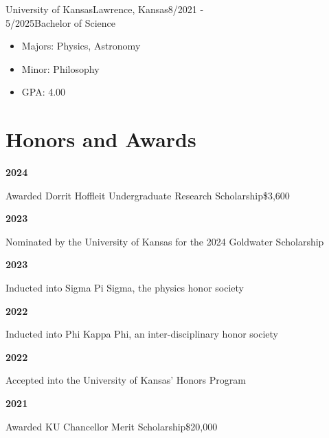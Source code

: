 \documentclass[12pt]{article}
\begin{document}
\begin{education}{University of Kansas}{Lawrence, Kansas}{8/2021 -\\ 5/2025}{Bachelor of Science}
  \begin{itemize}
    \item Majors: Physics, Astronomy
    \item Minor: Philosophy
    \item GPA: 4.00
  \end{itemize}
\end{education}



\section*{Honors and Awards}\vspace{-1ex}

\newcommand{\award}[3]{
  \begin{minipage}[t]{0.75in}
    \textbf{#1}
  \end{minipage}
  \begin{minipage}[t]{\dimexpr\textwidth-0.75in}
    #2\hfill#3
  \end{minipage}
}

\award{2024}{Awarded Dorrit Hoffleit Undergraduate Research Scholarship}{\$3,600}
\award{2023}{Nominated by the University of Kansas for the 2024 Goldwater Scholarship}{}
\award{2023}{Inducted into Sigma Pi Sigma, the physics honor society}{}
\award{2022}{Inducted into Phi Kappa Phi, an inter-disciplinary honor society}{}
\award{2022}{Accepted into the University of Kansas' Honors Program}{}
\award{2021}{Awarded KU Chancellor Merit Scholarship}{\$20,000}
\end{document}
